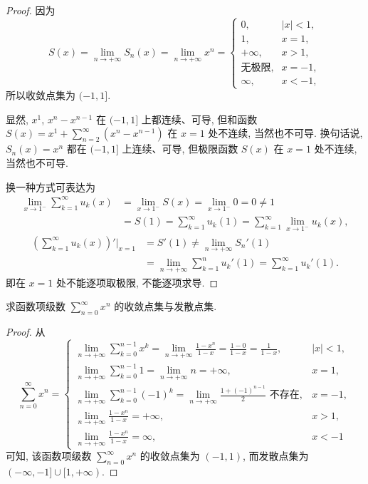 \begin{proof}
因为
\[
  S(x)=\lim_{n\to+\infty}S_{n}(x)=\lim_{n\to+\infty}x^{n}=\begin{cases}
    0, & |x|<1,\\
    1, & x=1,\\
    +\infty, & x>1,\\
    \text{无极限}, & x=-1,\\
    \infty, & x<-1,
\end{cases}
\]
所以收敛点集为 $(-1,1]$.

显然, $x^{1}$, $x^{n}-x^{n-1}$ 在 $(-1,1]$ 上都连续、可导, 但和函数 $S(x)=x^{1}+\sum_{n=2}^{\infty}(x^{n}-x^{n-1})$ 在 $x=1$ 处不连续, 当然也不可导. 换句话说, $S_{n}(x)=x^{n}$ 都在 $(-1,1]$ 上连续、可导, 但极限函数 $S(x)$ 在 $x=1$ 处不连续, 当然也不可导.

换一种方式可表达为
\[
  \begin{aligned}
    \lim_{x\to1^{-}}\sum_{k=1}^{\infty}u_{k}(x)&=\lim_{x\to1^{-}}S(x)=\lim_{x\to1^{-}}0=0\neq1\\
    &=S(1)=\sum_{k=1}^{\infty}u_{k}(1)=\sum_{k=1}^{\infty}\lim_{x\to1^{-}}u_{k}(x),
  \end{aligned}
\]
\[
  \begin{aligned}
    \left(\sum_{k=1}^{\infty}u_{k}(x)\right)'\bigg|_{x=1}&=S'(1)\neq\lim_{n\to+\infty}S_{n}'(1)\\
    &=\lim_{n\to+\infty}\sum_{k=1}^{n}u_{k}'(1)=\sum_{k=1}^{\infty}u_{k}'(1).
  \end{aligned}
\]
即在 $x=1$ 处不能逐项取极限, 不能逐项求导.
\end{proof}

\begin{example}\label{ex:13.1.2}
求函数项级数 $\sum_{n=0}^{\infty}x^{n}$ 的收敛点集与发散点集.
\end{example}

\begin{proof}
从
\[
  \sum_{n=0}^{\infty}x^{n}=\begin{cases}
    \lim\limits_{n\to+\infty}\sum\limits_{k=0}^{n-1}x^{k}=\lim\limits_{n\to+\infty}\frac{1-x^{n}}{1-x}=\frac{1-0}{1-x}=\frac{1}{1-x}, & |x|<1,\\
    \lim\limits_{n\to+\infty}\sum\limits_{k=0}^{n-1}1=\lim\limits_{n\to+\infty}n=+\infty, & x=1,\\
    \lim\limits_{n\to+\infty}\sum\limits_{k=0}^{n-1}(-1)^{k}=\lim\limits_{n\to+\infty}\frac{1+(-1)^{n-1}}{2}\text{ 不存在}, & x=-1,\\
    \lim\limits_{n\to+\infty}\frac{1-x^{n}}{1-x}=+\infty, & x>1,\\
    \lim\limits_{n\to+\infty}\frac{1-x^{n}}{1-x}=\infty, & x<-1
\end{cases}
\]
可知, 该函数项级数 $\sum_{n=0}^{\infty}x^{n}$ 的收敛点集为 $(-1,1)$, 而发散点集为 $(-\infty,-1]\cup[1,+\infty)$.
\end{proof}

